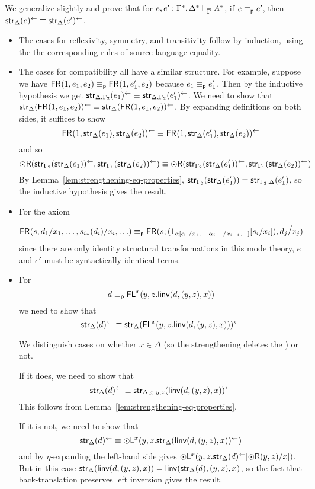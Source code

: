 \begin{enumerate}
We generalize slightly and prove that for 
$e,e' : \Gamma^*,\Delta^* \vdash_{\overline{\Gamma}} A^*$, 
if $e \equiv_{\mathsf{p}} e'$, then $\mathsf{str}_{\Delta}(e)^{\leftarrow} \equiv \mathsf{str}_{\Delta}(e')^{\leftarrow}$.

\begin{itemize}

\item The cases for reflexivity, symmetry, and transitivity follow by
  induction, using the the corresponding rules of source-language
  equality.

\item The cases for compatibility all have a similar structure.  For
  example, suppose we have $\mathsf{FR}_{}(1,e_1,e_2) \equiv_{\mathsf{p}}
  \mathsf{FR}_{}(1,e_1',e_2)$ because $e_1 \equiv_{\mathsf{p}} e_1'$.
  Then by the inductive
  hypothesis we get $\mathsf{str}_{\Delta,\Gamma_2}(e_1)^{\leftarrow} \equiv
  \mathsf{str}_{\Delta,\Gamma_2}(e_1')^{\leftarrow}$.
  We need to show that $\mathsf{str}_{\Delta}(\mathsf{FR}_{}(1,e_1,e_2))^{\leftarrow} \equiv 
  \mathsf{str}_{\Delta}(\mathsf{FR}_{}(1,e_1,e_2))^{\leftarrow}$.  By expanding definitions
  on both sides, it suffices to show
  \[
    \mathsf{FR}_{}(1,\mathsf{str}_{\Delta}(e_1),\mathsf{str}_{\Delta}(e_2))^{\leftarrow}
    \equiv 
    \mathsf{FR}_{}(1,\mathsf{str}_{\Delta}(e_1'),\mathsf{str}_{\Delta}(e_2))^{\leftarrow}
  \]
  and so
  \[
    \mathord{\odot}\mathsf{R}(\mathsf{str}_{\Gamma_2}(\mathsf{str}_{\Delta}(e_1))^{\leftarrow},\mathsf{str}_{\Gamma_1}(\mathsf{str}_{\Delta}(e_2))^{\leftarrow})
    \equiv 
    \mathord{\odot}\mathsf{R}(\mathsf{str}_{\Gamma_2}(\mathsf{str}_{\Delta}(e_1'))^{\leftarrow},\mathsf{str}_{\Gamma_1}(\mathsf{str}_{\Delta}(e_2))^{\leftarrow})
  \]
  By Lemma~\ref{lem:strengthening-eq-properties}, ${\mathsf{str}_{\Gamma_2}(\mathsf{str}_{\Delta}(e_1'))} =
  {\mathsf{str}_{\Gamma_2,\Delta}(e_1')}$, so the inductive hypothesis gives the
  result.

\item For the axiom

\[
\mathsf{FR}_{}(s,d_1/x_1,\ldots,{s_i}_*(d_i)/x_i,\ldots) \equiv_{\mathsf{p}} \mathsf{FR}_{}(s;(1_{\alpha[\alpha_1/x_1,\ldots,\alpha_{i-1}/x_{i-1},\ldots]}[s_i/x_i]),\vec{d_j/x_j})\\
\]
since there are only identity structural transformations in this mode
theory, $e$ and $e'$ must be syntactically identical terms.

\item For 
\[
d \equiv_{\mathsf{p}} \mathsf{FL}^{x}(y,z.\mathsf{linv}(d,(y,z),x))
\]
we need to show that
\[
\mathsf{str}_{\Delta}(d)^{\leftarrow}
\equiv 
\mathsf{str}_{\Delta}(\mathsf{FL}^{x}(y,z.\mathsf{linv}(d,(y,z),x)))^{\leftarrow}
\]

We distinguish cases on whether $x \in \Delta$ (so the strengthening
deletes the \FL) or not.

If it does, we need to show that 
\[
\mathsf{str}_{\Delta}(d)^{\leftarrow}
\equiv 
\mathsf{str}_{\Delta,x,y,z}(\mathsf{linv}(d,(y,z),x))^{\leftarrow}
\]
This follows from Lemma~\ref{lem:strengthening-eq-properties}.  

If it is not, we need to show that 
\[
\mathsf{str}_{\Delta}(d)^{\leftarrow}
\equiv 
\mathord{\odot}\mathsf{L}^{x}(y,z.\mathsf{str}_{\Delta}(\mathsf{linv}(d,(y,z),x))^{\leftarrow})
\]
and by $\eta$-expanding the left-hand side gives
$\mathord{\odot}\mathsf{L}^{x}(y,z.\mathsf{str}_{\Delta}(d)^{\leftarrow}[\mathord{\odot}\mathsf{R}(y,z)/x])$.
But in this case 
$\mathsf{str}_{\Delta}(\mathsf{linv}(d,(y,z),x)) = \mathsf{linv}(\mathsf{str}_{\Delta}(d),(y,z),x)$,
so the fact that back-translation preserves left inversion gives the
result.  

\end{itemize}

\end{enumerate}
